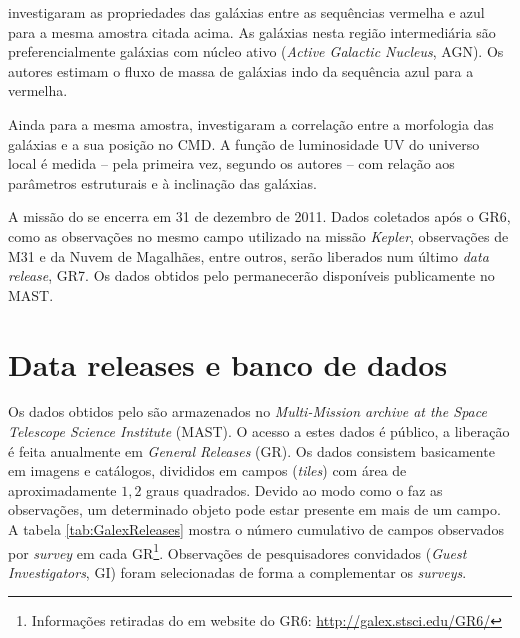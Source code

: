 \citet{Martin2007} investigaram as propriedades das galáxias entre as sequências
vermelha e azul para a mesma amostra citada acima. As galáxias nesta região
intermediária são preferencialmente galáxias com núcleo ativo ({\em Active
Galactic Nucleus}, AGN). Os autores estimam o fluxo de massa de galáxias indo da
sequência azul para a vermelha.

Ainda para a mesma amostra, \citet{Schiminovich2007} investigaram a correlação
entre a morfologia das galáxias e a sua posição no CMD. A função de luminosidade
UV do universo local é medida -- pela primeira vez, segundo os autores -- com
relação aos parâmetros estruturais e à inclinação das galáxias.

A missão do \galex se encerra em 31 de dezembro de 2011. Dados coletados após o
GR6, como as observações no mesmo campo utilizado na missão {\em Kepler},
observações de M31 e da Nuvem de Magalhães, entre outros, serão liberados num
último {\em data release}, GR7. Os dados obtidos pelo \galex permanecerão
disponíveis publicamente no MAST.




\section{Data releases e banco de dados}
\label{sec:Galex:BancoDeDados}

Os dados obtidos pelo \galex são armazenados no {\em Multi-Mission archive at
the Space Telescope Science Institute} (MAST). O acesso a estes dados é público,
a liberação é feita anualmente em {\em General Releases} (GR). Os dados
consistem basicamente em imagens e catálogos, divididos em campos ({\em tiles})
com área de aproximadamente $1,2$ graus quadrados. Devido ao modo como o \galex
faz as observações, um determinado objeto pode estar presente em mais de um
campo. A tabela \ref{tab:GalexReleases} mostra o número cumulativo de campos
observados por {\em survey} em cada GR\footnote{Informações retiradas do {em
website} do GR6: \url{http://galex.stsci.edu/GR6/}}. Observações de
pesquisadores convidados ({\em Guest Investigators}, GI) foram selecionadas de
forma a complementar os {\em surveys}.

